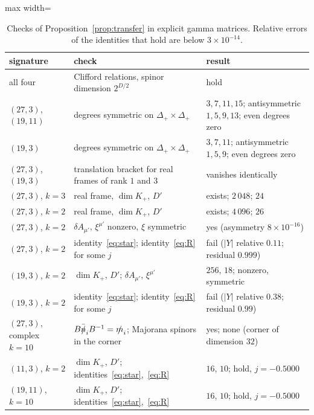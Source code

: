 \begin{table}[htbp]
\centering
\begin{adjustbox}{max width=\linewidth}\begin{tabular}{@{}lll@{}}
\toprule
signature & check & result\\
\midrule
all four & Clifford relations, spinor dimension $2^{D/2}$ & hold\\
$(27,3)$, $(19,11)$ & degrees symmetric on $\Delta_+\times\Delta_+$ & $3,7,11,15$; antisymmetric $1,5,9,13$; even degrees zero\\
$(19,3)$ & degrees symmetric on $\Delta_+\times\Delta_+$ & $3,7,11$; antisymmetric $1,5,9$; even degrees zero\\
$(27,3)$, $(19,3)$ & translation bracket for real frames of rank $1$ and $3$ & vanishes identically\\
$(27,3)$, $k=3$ & real frame, $\dim K_+$, $D'$ & exists; $2\,048$; $24$\\
$(27,3)$, $k=2$ & real frame, $\dim K_+$, $D'$ & exists; $4\,096$; $26$\\
$(27,3)$, $k=2$ & $\delta A_{\mu'}$, $\xi^{\mu'}$ nonzero, $\xi$ symmetric & yes (asymmetry $8\times10^{-16}$)\\
$(27,3)$, $k=2$ & identity~\eqref{eq:star}; identity~\eqref{eq:R} for some $j$ & fail ($|Y|$ relative $0.11$; residual $0.999$)\\
$(19,3)$, $k=2$ & $\dim K_+$, $D'$; $\delta A_{\mu'}$, $\xi^{\mu'}$ & $256$, $18$; nonzero, symmetric\\
$(19,3)$, $k=2$ & identity~\eqref{eq:star}; identity~\eqref{eq:R} for some $j$ & fail ($|Y|$ relative $0.38$; residual $0.99$)\\
$(27,3)$, complex $k=10$ & $B\bar{\slashed{n}}_iB^{-1}=\slashed{m}_i$; Majorana spinors in the corner & yes; none (corner of dimension $32$)\\
$(11,3)$, $k=2$ & $\dim K_+$, $D'$; identities~\eqref{eq:star},~\eqref{eq:R} & $16$, $10$; hold, $j=-0.5000$\\
$(19,11)$, $k=10$ & $\dim K_+$, $D'$; identities~\eqref{eq:star},~\eqref{eq:R} & $16$, $10$; hold, $j=-0.5000$\\
\bottomrule
\end{tabular}\end{adjustbox}
\caption{Checks of Proposition~\ref{prop:transfer} in explicit gamma matrices. Relative errors of the identities that hold are below $3\times10^{-14}$.}
\label{tab:transfercheck}
\end{table}

